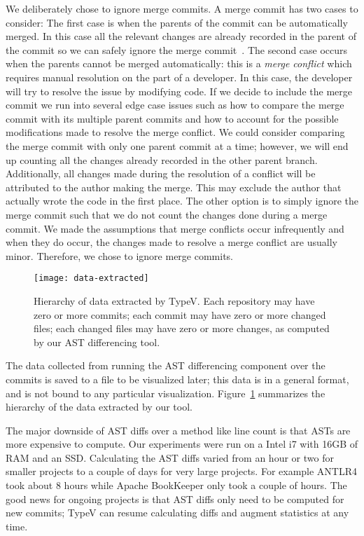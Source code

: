 We deliberately chose to ignore merge commits. A merge commit has two cases to consider: The first case is when the parents of the commit can be automatically merged. In this case all the relevant changes are already recorded in the parent of the commit so we can safely ignore the merge commit~\cite{git:merge}. The second case occurs when the parents cannot be merged automatically: this is a \emph{merge conflict} which requires manual resolution on the part of a developer. In this case, the developer will try to resolve the issue by modifying code. If we decide to include the merge commit we run into several edge case issues such as how to compare the merge commit with its multiple parent commits and how to account for the possible modifications made to resolve the merge conflict. We could consider comparing the merge commit with only one parent commit at a time; however, we will end up counting all the changes already recorded in the other parent branch. Additionally, all changes made during the resolution of a conflict will be attributed to the author making the merge. This may exclude the author that actually wrote the code in the first place. The other option is to simply ignore the merge commit such that we do not count the changes done during a merge commit. We made the assumptions that merge conflicts occur infrequently and when they do occur, the changes made to resolve a merge conflict are usually minor. Therefore, we chose to ignore merge commits. 

\begin{figure}[h]
\centering
\texttt{[image: data-extracted]}
\caption{Hierarchy of data extracted by TypeV. Each repository may have zero or more commits; each commit may have zero or more changed files; each changed files may have zero or more changes, as computed by our AST differencing tool.}
\label{fig:data-extracted}
\end{figure}

The data collected from running the AST differencing component over the commits is saved to a file to be visualized later; this data is in a general format, and is not bound to any particular visualization. Figure~\ref{fig:data-extracted} summarizes the hierarchy of the data extracted by our tool.

The major downside of AST diffs over a method like line count is that ASTs are more expensive to compute. Our experiments were run on a Intel i7 with 16GB of RAM and an SSD. Calculating the AST diffs varied from an hour or two for smaller projects to a couple of days for very large projects. For example ANTLR4 took about 8 hours while Apache BookKeeper only took a couple of hours. The good news for ongoing projects is that AST diffs only need to be computed for new commits; TypeV can resume calculating diffs and augment statistics at any time.

